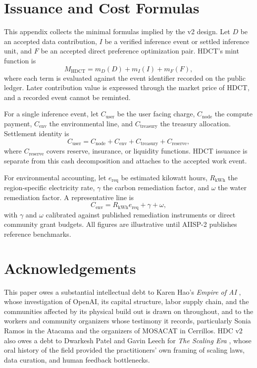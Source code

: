 \documentclass[10pt,a4paper,twocolumn]{article}
\begin{document}
\section{Issuance and Cost Formulas}
\label{sec:appendix-formulas}

This appendix collects the minimal formulas implied by the v2 design. Let $D$ be an accepted data contribution, $I$ be a verified inference event or settled inference unit, and $F$ be an accepted direct preference optimization pair. HDCT's mint function is
\[
M_{\mathrm{HDCT}} = m_D(D) + m_I(I) + m_F(F),
\]
where each term is evaluated against the event identifier recorded on the public ledger. Later contribution value is expressed through the market price of HDCT, and a recorded event cannot be reminted.

For a single inference event, let $C_{\mathrm{user}}$ be the user facing charge, $C_{\mathrm{node}}$ the compute payment, $C_{\mathrm{env}}$ the environmental line, and $C_{\mathrm{treasury}}$ the treasury allocation. Settlement identity is
\[
C_{\mathrm{user}} = C_{\mathrm{node}} + C_{\mathrm{env}} + C_{\mathrm{treasury}} + C_{\mathrm{reserve}},
\]
where $C_{\mathrm{reserve}}$ covers reserve, insurance, or liquidity functions. HDCT issuance is separate from this cash decomposition and attaches to the accepted work event.

For environmental accounting, let $e_{\mathrm{req}}$ be estimated kilowatt hours, $R_{\mathrm{kWh}}$ the region-specific electricity rate, $\gamma$ the carbon remediation factor, and $\omega$ the water remediation factor. A representative line is
\[
C_{\mathrm{env}} = R_{\mathrm{kWh}} e_{\mathrm{req}} + \gamma + \omega,
\]
with $\gamma$ and $\omega$ calibrated against published remediation instruments or direct community grant budgets. All figures are illustrative until AIISP-2 publishes reference benchmarks.

\onecolumn
\normalsize
\newpage
\section*{Acknowledgements}

This paper owes a substantial intellectual debt to Karen Hao's \emph{Empire of AI} \citep{hao2025empire}, whose investigation of OpenAI, its capital structure, labor supply chain, and the communities affected by its physical build out is drawn on throughout, and to the workers and community organizers whose testimony it records, particularly Sonia Ramos in the Atacama and the organizers of MOSACAT in Cerrillos. HDC v2 also owes a debt to Dwarkesh Patel and Gavin Leech for \emph{The Scaling Era} \citep{patel2025scaling}, whose oral history of the field provided the practitioners' own framing of scaling laws, data curation, and human feedback bottlenecks.
\end{document}
